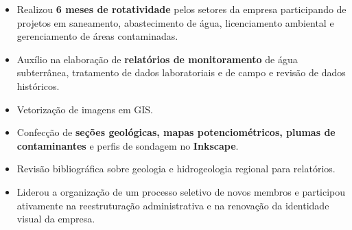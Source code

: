 \documentclass[10pt,a4paper,ragged2e,academicons]{altacv}
\begin{document}
\begin{itemize}
    \item Realizou \textbf{6 meses de rotatividade} pelos setores da empresa participando de projetos em saneamento, abastecimento de água, licenciamento ambiental e gerenciamento de áreas contaminadas.
    \item Auxílio na elaboração de \textbf{relatórios de monitoramento} de água subterrânea, tratamento de dados laboratoriais e de campo e revisão de dados históricos. 
    \item Vetorização de imagens em GIS.
    \item Confecção de \textbf{seções geológicas, mapas potenciométricos, plumas de contaminantes} e perfis de sondagem no \textbf{Inkscape}.
    \item Revisão bibliográfica sobre geologia e hidrogeologia regional para relatórios.
\end{itemize}
\divider

\begin{fullwidth}

\begin{itemize}
    \item Liderou a organização de um processo seletivo de novos membros e participou ativamente na reestruturação administrativa e na renovação da identidade visual da empresa.
    
\end{itemize}





\end{fullwidth}

% 
% 
% 
% 
% 
% 
% 
\end{document}
